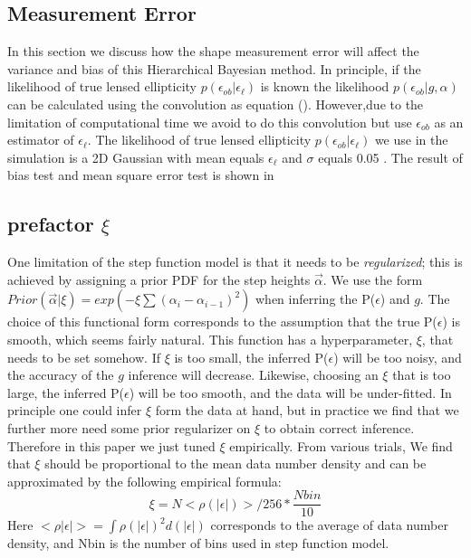\documentclass[useAMS,usenatbib]{mn2e}
\begin{document}
\subsection{Measurement Error}
In this section we  discuss how the shape measurement error will
affect the variance and bias of this Hierarchical Bayesian method.
In principle, if the likelihood of true lensed ellipticity $p(\epsilon_{ob}|\epsilon_{\ell})$
is known the likelihood $p(\epsilon_{ob}|g,\alpha)$ can be calculated using the convolution as equation ().
However,due to the limitation of computational time we avoid to do this convolution but use $\epsilon_{ob}$
as an estimator of $\epsilon_{\ell}$.
The likelihood of true lensed ellipticity $p(\epsilon_{ob}|\epsilon_{\ell})$ we use in the simulation is a 2D
Gaussian with mean equals $\epsilon_{\ell}$ and $\sigma$ equals 0.05 .
The result of bias test and mean square error test is shown in 




\subsection{prefactor $\xi$}

One limitation of the step function model is that it needs to be \textit{regularized};
this is achieved by assigning a prior PDF for the step heights $\vec{\alpha}$.
We use the form $Prior(\vec{\alpha}|\xi)=exp(-\xi\sum(\alpha_{i}-\alpha_{i-1})^{2})$
when inferring the P($\epsilon$) and $g$. The choice of this functional
form corresponds to the assumption that the true P($\epsilon$) is
smooth, which seems fairly natural. This function has a hyperparameter,
$\xi$, that needs to be set somehow. If $\xi$ is too small, the
inferred P($\epsilon$) will be too noisy, and the accuracy of the
$g$ inference will decrease. Likewise, choosing an $\xi$ that is
too large, the inferred P($\epsilon$) will be too smooth, and the
data will be under-fitted. In principle one could infer $\xi$ form
the data at hand, but in practice we find that we further more need some
prior regularizer on $\xi$ to obtain correct inference. Therefore in this paper 
we just tuned $\xi$ empirically. From various trials, We find
that $\xi$ should be proportional to the mean data number density and can
be approximated by the following empirical formula: 
\begin{equation}
\xi=N<\rho(|\epsilon|)>/256*\frac{Nbin}{10}
\end{equation}
Here $<\rho|\epsilon|>=\int\rho(|\epsilon|)^{2}d(|\epsilon|)$ corresponds
to the average of data number density, and Nbin is the number of bins used 
in step function model. 
\end{document}
